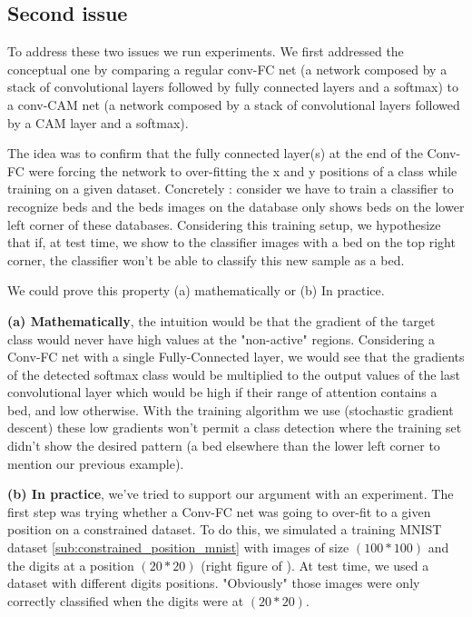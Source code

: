 		\subsection{Second issue}
		\label{sub:second_issue}		
			To address these two issues we run experiments. We first addressed the conceptual one by comparing a regular conv-FC net (a network composed by a stack of convolutional layers followed by fully connected layers and a softmax) to a conv-CAM net (a network composed by a stack of convolutional layers followed by a CAM layer and a softmax). 
			
			The idea was to confirm that the fully connected layer(s) at the end of the Conv-FC were forcing the network to over-fitting the x and y positions of a class while training on a given dataset. Concretely : consider we have to train a classifier to recognize beds and the beds images on the database only shows beds on the lower left corner of these databases. Considering this training setup, we hypothesize that if, at test time, we show to the classifier images with a bed on the top right corner, the classifier won't be able to classify this new sample as a bed.

			We could prove this property (a) mathematically or (b) In practice.

			\textbf{(a) Mathematically}, the intuition would be that the gradient of the target class would never have high values at the "non-active" regions. Considering a Conv-FC net with a single Fully-Connected layer, we would see that the gradients of the detected softmax class would be multiplied to the output values of the last convolutional layer which would be high if their range of attention contains a bed, and low otherwise. With the training algorithm we use (stochastic gradient descent) these low gradients won't permit a class detection where the training set didn't show the desired pattern (a bed elsewhere than the lower left corner to mention our previous example).

			\textbf{(b) In practice}, we've tried to support our argument with an experiment. The first step was trying whether a Conv-FC net was going to over-fit to a given position on a constrained dataset. To do this, we simulated a training MNIST dataset \ref{sub:constrained_position_mnist} with images of size $(100*100)$ and the digits at a position $(20*20)$ (right figure of ). At test time, we used a dataset with different digits positions. "Obviously" those images were only correctly classified when the digits were at $(20*20)$. 

